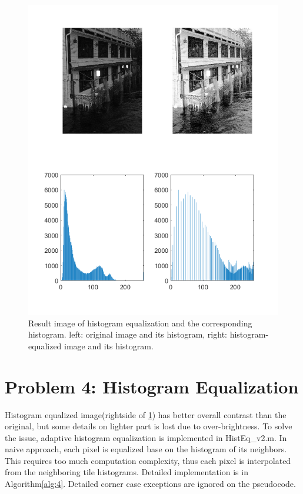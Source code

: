 \documentclass[extendedabs]{bmvc2k}
\begin{document}
\begin{figure}[h]
    \centering
    \includegraphics[width=\linewidth]{hw1_3}
    \caption{Result image of histogram equalization and the corresponding histogram.
    left: original image and its histogram, right: histogram-equalized image and its histogram.}
    \label{fig:4}
    \vspace{-2mm}
\end{figure}

\section*{Problem 4: Histogram Equalization}

Histogram equalized image(rightside of \figurename{\ref{fig:4}}) has better 
overall contrast than the original, but some details on lighter part 
is lost due to over-brightness.
To solve the issue, adaptive histogram equalization is implemented in
HistEq\_v2.m. In naive approach, each pixel is equalized base on the histogram
of its neighbors. This requires too much computation complexity, thus
each pixel is interpolated from the neighboring tile histograms.
Detailed implementation is in Algorithm\ref{alg:4}. Detailed corner case 
exceptions are ignored on the pseudocode.
\end{document}
